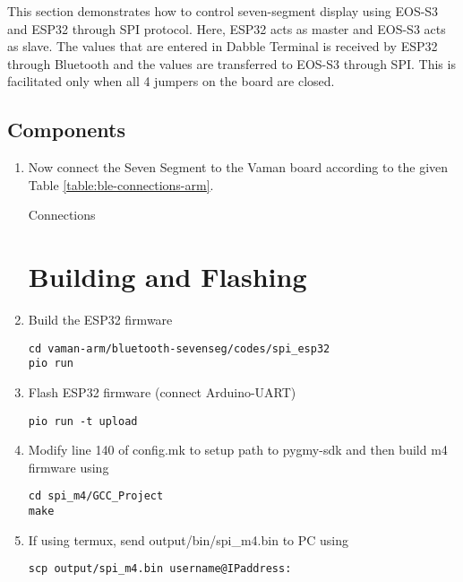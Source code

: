 This section demonstrates how to control seven-segment display using EOS-S3 and
ESP32 through SPI protocol. Here, ESP32 acts as master and EOS-S3 acts as slave.
The values that are entered in Dabble Terminal is received by ESP32 through 
Bluetooth and the values are transferred to EOS-S3 through SPI. This is 
facilitated only when all 4 jumpers on the board are closed.
\subsection{Components}
\begin{enumerate}[label=\thesection.\arabic*.,ref=\thesection.\theenumi]

\begin{table}[!ht]
\centering

\caption{Components}
\label{table:ble-components-arm}
\end{table}
\item Now connect the Seven Segment to the Vaman board according to the given 
Table \ref{table:ble-connections-arm}.
\begin{table}[!ht]
\centering

\caption{Connections}
\label{table:ble-connections-arm}
\end{table}

\section{Building and Flashing}
\raggedright
\item Build the ESP32 firmware
\begin{lstlisting}
cd vaman-arm/bluetooth-sevenseg/codes/spi_esp32
pio run
\end{lstlisting} 

\item Flash ESP32 firmware (connect Arduino-UART)
\begin{lstlisting}
pio run -t upload
\end{lstlisting} 

\item  Modify line 140 of config.mk to setup path to pygmy-sdk and then build m4
firmware using
\begin{lstlisting}
cd spi_m4/GCC_Project
make
\end{lstlisting}

\item If using termux, send output/bin/spi{\_}m4.bin to PC using
\begin{lstlisting}
scp output/spi_m4.bin username@IPaddress:
\end{lstlisting}


\end{enumerate}
